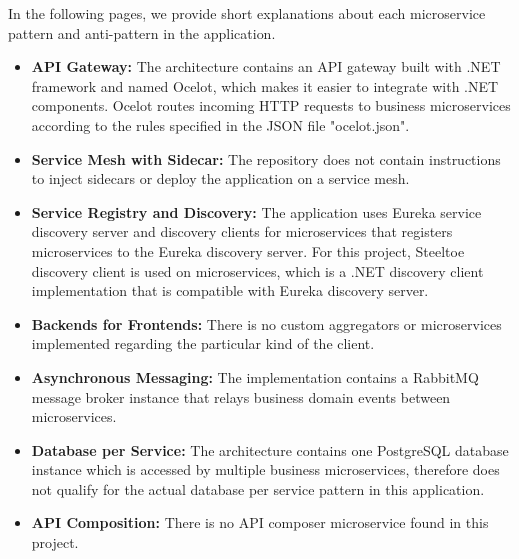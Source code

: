 \documentclass{Configuration_Files/PoliMi3i_thesis}
\begin{document}
In the following pages, we provide short explanations about each microservice pattern and anti-pattern in the application.

\begin{itemize}
    \item \textbf{API Gateway:} The architecture contains an API gateway built with .NET framework and named Ocelot\footnotemark[103], which makes it easier to integrate with .NET components.
    Ocelot routes incoming HTTP requests to business microservices according to the rules specified in the JSON file "ocelot.json".
    
    \item \textbf{Service Mesh with Sidecar:} The repository does not contain instructions to inject sidecars or deploy the application on a service mesh.
    
    \item \textbf{Service Registry and Discovery:} The application uses Eureka service discovery server and discovery clients for microservices that registers microservices to the Eureka discovery server.
    For this project, Steeltoe\footnotemark[104] discovery client is used on microservices, which is a .NET discovery client implementation that is compatible with Eureka discovery server.
    
    \item \textbf{Backends for Frontends:} There is no custom aggregators or microservices implemented regarding the particular kind of the client.
    
    \item \textbf{Asynchronous Messaging:} The implementation contains a RabbitMQ message broker instance that relays business domain events between microservices.
    
    \item \textbf{Database per Service:} The architecture contains one PostgreSQL database instance which is accessed by multiple business microservices, therefore does not qualify for the actual database per service pattern in this application.
    
    \item \textbf{API Composition:} There is no API composer microservice found in this project.
    

\end{itemize}
\end{document}

